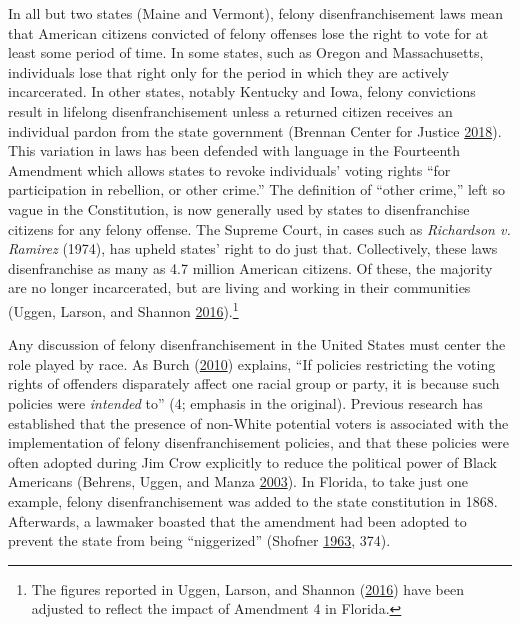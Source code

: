 \documentclass[
  12pt,
]{article}
\begin{document}
In all but two states (Maine and Vermont), felony disenfranchisement laws mean that American citizens convicted of felony offenses lose the right to vote for at least some period of time. In some states, such as Oregon and Massachusetts, individuals lose that right only for the period in which they are actively incarcerated. In other states, notably Kentucky and Iowa, felony convictions result in lifelong disenfranchisement unless a returned citizen receives an individual pardon from the state government (Brennan Center for Justice \protect\hyperlink{ref-bcj_laws}{2018}). This variation in laws has been defended with language in the Fourteenth Amendment which allows states to revoke individuals' voting rights ``for participation in rebellion, or other crime.'' The definition of ``other crime,'' left so vague in the Constitution, is now generally used by states to disenfranchise citizens for any felony offense. The Supreme Court, in cases such as \emph{Richardson v. Ramirez} (1974), has upheld states' right to do just that. Collectively, these laws disenfranchise as many as 4.7 million American citizens. Of these, the majority are no longer incarcerated, but are living and working in their communities (Uggen, Larson, and Shannon \protect\hyperlink{ref-sentencing_2016}{2016}).\footnote{The figures reported in Uggen, Larson, and Shannon (\protect\hyperlink{ref-sentencing_2016}{2016}) have been adjusted to reflect the impact of Amendment 4 in Florida.}

Any discussion of felony disenfranchisement in the United States must center the role played by race. As Burch (\protect\hyperlink{ref-Burch2010}{2010}) explains, ``If policies restricting the voting rights of offenders disparately affect one racial group or party, it is because such policies were \emph{intended} to'' (4; emphasis in the original). Previous research has established that the presence of non-White potential voters is associated with the implementation of felony disenfranchisement policies, and that these policies were often adopted during Jim Crow explicitly to reduce the political power of Black Americans (Behrens, Uggen, and Manza \protect\hyperlink{ref-Behrens2003}{2003}). In Florida, to take just one example, felony disenfranchisement was added to the state constitution in 1868. Afterwards, a lawmaker boasted that the amendment had been adopted to prevent the state from being ``niggerized'' (Shofner \protect\hyperlink{ref-florida_1868}{1963}, 374).
\end{document}
